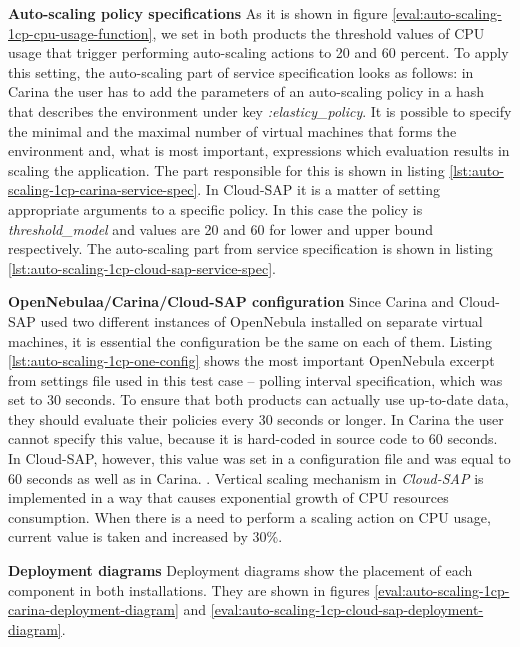 \begin{asparaenum}
  \item[\textbf{Auto-scaling policy specifications}] As it is shown in figure \ref{eval:auto-scaling-1cp-cpu-usage-function}, we set in both products the threshold values of CPU usage that trigger performing auto-scaling actions to 20 and 60 percent. To apply this setting, the auto-scaling part of service specification looks as follows: in Carina the user has to add the parameters of an auto-scaling policy in a hash that describes the environment under key \emph{:elasticy\_policy}. It is possible to specify the minimal and the maximal number of virtual machines that forms the environment and, what is most important, expressions which evaluation results in scaling the application. The part responsible for this is shown in listing \ref{lst:auto-scaling-1cp-carina-service-spec}. In Cloud-SAP it is a matter of setting appropriate arguments to a specific policy. In this case the policy is \emph{threshold\_model} and values are 20 and 60 for lower and upper bound respectively. The auto-scaling part from service specification is shown in listing \ref{lst:auto-scaling-1cp-cloud-sap-service-spec}. 
  \item[\textbf{OpenNebulaa/Carina/Cloud-SAP configuration}] Since Carina and Cloud-SAP used two different instances of OpenNebula installed on separate virtual machines, it is essential the configuration be the same on each of them. Listing \ref{lst:auto-scaling-1cp-one-config} shows the most important OpenNebula excerpt from settings file used in this test case -- polling interval specification, which was set to 30 seconds. To ensure that both products can actually use up-to-date data, they should evaluate their policies every 30 seconds or longer. In Carina the user cannot specify this value, because it is hard-coded in source code to 60 seconds. In Cloud-SAP, however, this value was set in a configuration file and was equal to 60 seconds as well as in Carina. . Vertical scaling mechanism in \emph{Cloud-SAP} is implemented in a way that causes exponential growth of CPU resources consumption. When there is a need to perform a scaling action on CPU usage, current value is taken and increased by 30\%.
  \item[\textbf{Deployment diagrams}] Deployment diagrams show the placement of each component in both installations. They are shown in figures \ref{eval:auto-scaling-1cp-carina-deployment-diagram} and \ref{eval:auto-scaling-1cp-cloud-sap-deployment-diagram}.


\end{asparaenum}
